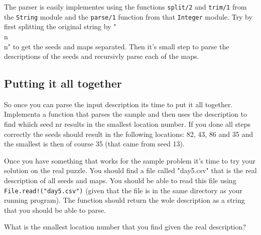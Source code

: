 \documentclass[a4paper,11pt]{article}
\begin{document}
The parser is easily implementes using the functions {\tt split/2} and
{\tt trim/1} from the {\tt String} module and the {\tt parse/1}
function from that {\tt Integer} module. Try by first splitting the
original string by "\\n\\n" to get the seeds and maps separated. Then
it's small step to parse the descriptions of the seeds and recursivly
parse each of the maps.

\subsection*{Putting it all together}

So once you can parse the input description its time to put it all
together. Implementa a function that parses the sample and then uses
the description to find whiich seed nr results in the smallest
location number. If you done all steps correctly the seeds should
result in the following locations: 82, 43, 86 and 35 and the smallest
is then of course 35 (that came from seed 13). 

Once you have something that works for the sample problem it's time to
try your solution on the real puzzle. You should find a file called
"day5.csv" that is the real description of all seeds and maps. You
should be able to read this file using {\tt File.read!("day5.csv")}
(given that the file is in the same directory as your running
program). The function should return the wole description as a string
that you should be able to parse.

What is the smallest location number that you find given the real
description?
\end{document}

